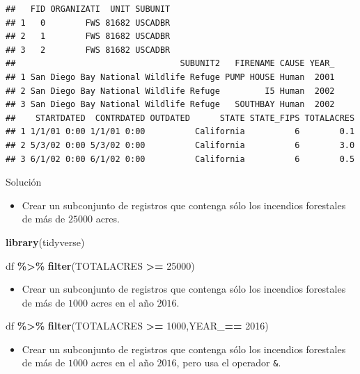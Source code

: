 \documentclass[
]{book}
\newenvironment{Shaded}{\begin{snugshade}}{\end{snugshade}}
\newcommand{\DecValTok}[1]{\textcolor[rgb]{0.00,0.00,0.81}{#1}}
\newcommand{\FunctionTok}[1]{\textcolor[rgb]{0.13,0.29,0.53}{\textbf{#1}}}
\newcommand{\NormalTok}[1]{#1}
\newcommand{\SpecialCharTok}[1]{\textcolor[rgb]{0.81,0.36,0.00}{\textbf{#1}}}
\providecommand{\tightlist}{%
  \setlength{\itemsep}{0pt}\setlength{\parskip}{0pt}}
\begin{document}
\begin{verbatim}
##   FID ORGANIZATI  UNIT SUBUNIT
## 1   0        FWS 81682 USCADBR
## 2   1        FWS 81682 USCADBR
## 3   2        FWS 81682 USCADBR
##                                 SUBUNIT2   FIRENAME CAUSE YEAR_
## 1 San Diego Bay National Wildlife Refuge PUMP HOUSE Human  2001
## 2 San Diego Bay National Wildlife Refuge         I5 Human  2002
## 3 San Diego Bay National Wildlife Refuge   SOUTHBAY Human  2002
##    STARTDATED  CONTRDATED OUTDATED      STATE STATE_FIPS TOTALACRES
## 1 1/1/01 0:00 1/1/01 0:00          California          6        0.1
## 2 5/3/02 0:00 5/3/02 0:00          California          6        3.0
## 3 6/1/02 0:00 6/1/02 0:00          California          6        0.5
\end{verbatim}

Solución

\begin{itemize}
\tightlist
\item
  Crear un subconjunto de registros que contenga sólo los incendios forestales de más de \(25000\) acres.
\end{itemize}

\begin{Shaded}
\begin{Highlighting}[]
\FunctionTok{library}\NormalTok{(tidyverse)}

\NormalTok{df }\SpecialCharTok{\%\textgreater{}\%} 
  \FunctionTok{filter}\NormalTok{(TOTALACRES }\SpecialCharTok{\textgreater{}=} \DecValTok{25000}\NormalTok{)}
\end{Highlighting}
\end{Shaded}

\begin{itemize}
\tightlist
\item
  Crear un subconjunto de registros que contenga sólo los incendios forestales de más de \(1000\) acres en el año \(2016\).
\end{itemize}

\begin{Shaded}
\begin{Highlighting}[]
\NormalTok{df }\SpecialCharTok{\%\textgreater{}\%} 
  \FunctionTok{filter}\NormalTok{(TOTALACRES }\SpecialCharTok{\textgreater{}=} \DecValTok{1000}\NormalTok{,YEAR\_}\SpecialCharTok{==} \DecValTok{2016}\NormalTok{)}
\end{Highlighting}
\end{Shaded}

\begin{itemize}
\tightlist
\item
  Crear un subconjunto de registros que contenga sólo los incendios forestales de más de \(1000\) acres en el año \(2016\), pero usa el operador \texttt{\&}.
\end{itemize}
\end{document}
